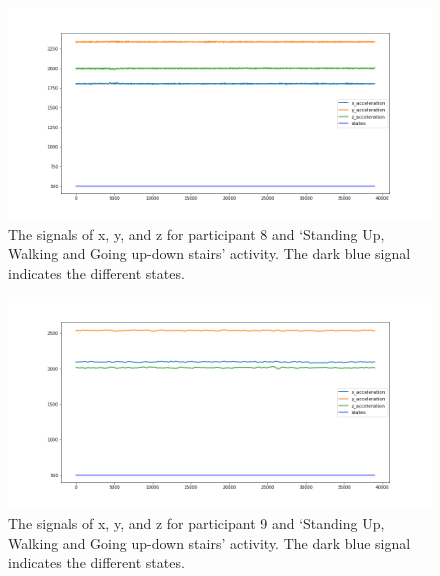 \begin{figure}[H]
    \centering
    \begin{minipage}[b]{1\textwidth}
        \includegraphics[width=\textwidth]{manuscript/src/figures/Ass3/Ass3_Q2_states_user_7.png}
    \end{minipage}
    \caption{The signals of x, y, and z for participant 8 and ‘Standing  Up,  Walking  and  Going  up-down  stairs’ activity. The dark blue signal indicates the different states.}
    \label{fig:Ass3_Q2_states_user_7}
\end{figure}
\begin{figure}[H]
    \centering
    \begin{minipage}[b]{1\textwidth}
        \includegraphics[width=\textwidth]{manuscript/src/figures/Ass3/Ass3_Q2_states_user_8.png}
    \end{minipage}
    \caption{The signals of x, y, and z for participant 9 and ‘Standing  Up,  Walking  and  Going  up-down  stairs’ activity. The dark blue signal indicates the different states.}
    \label{fig:Ass3_Q2_states_user_8}
\end{figure}
